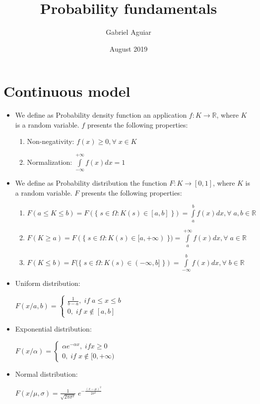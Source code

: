 \documentclass{article}
\title{Probability fundamentals}
\author{Gabriel Aguiar}
\date{August 2019}
\begin{document}
\maketitle

\section{Continuous model}

\begin{itemize}

\item We define as Probability density function an application $f: K \rightarrow \mathbb{R}$, where $K$ is a random variable. $f$ presents the following properties:

\begin{enumerate}

\item Non-negativity: $f(x) \geq 0, \forall \; x \in K$

\item Normalization: $\int\limits_{-\infty}^{+\infty} f(x) dx = 1$

\end{enumerate}

\item We define as Probability distribution the function $F: K \rightarrow [0,1]$, where $K$ is a random variable. $F$ presents the following properties:

\begin{enumerate}

\item $F(a \leq K \leq b) = F(\{ \; s \in \Omega: K(s) \in [a,b] \; \}) = \int\limits_{a}^{b} f(x) dx, \forall \; a,b \in \mathbb{R}$

\item $F(K \geq a) = F(\{ \; s \in \Omega: K(s) \in [a,+\infty) \; \}) = \int\limits_{a}^{+\infty} f(x) dx, \forall \; a \in \mathbb{R}$

\item $F(K \leq b) = F(\{ \; s \in \Omega: K(s) \in (-\infty,b] \; \}) = \int\limits_{-\infty}^{b} f(x) dx, \forall \; b \in \mathbb{R}$

\end{enumerate}

\item Uniform distribution:

$F(x/a,b) = \begin{cases} \frac{1}{b - a}, \; if \; a \leq x \leq b \\ 0, \; if \; x \notin [a,b] \end{cases}$

\item Exponential distribution:

$F(x/\alpha) = \begin{cases} \alpha e^{-\alpha x}, \; if x \geq 0 \\ 0, \; if \; x \notin [0,+\infty) \end{cases}$

\item Normal distribution:

$F(x/\mu,\sigma) = \frac{1}{\sqrt{2 \pi \sigma^{2}}} \; e^{-\frac{(x - \mu)^{2}}{2 \sigma^{2}}}$
        
\end{itemize}
\end{document}
